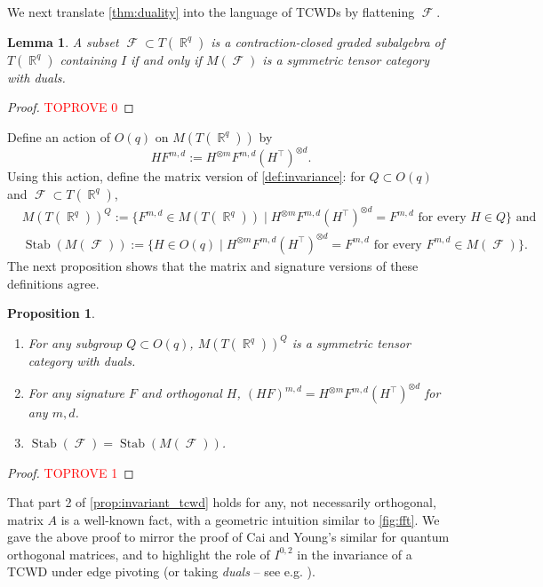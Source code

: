 \documentclass{article}
\newtheorem{proposition}{Proposition}[section]
\newtheorem{lemma}{Lemma}[section]
\theoremstyle{remark}
\theoremstyle{definition}
\DeclareMathOperator{\rr}{\mathbb{R}}
\DeclareMathOperator{\fc}{\mathcal{F}}
\DeclareMathOperator{\stab}{Stab}
\begin{document}
We next translate \autoref{thm:duality} into the language of TCWDs by flattening
$\fc$. 
\begin{lemma}
    \label{lem:tcwd}
    A subset $\fc \subset T(\rr^q)$ is a contraction-closed graded subalgebra of $T(\rr^q)$ containing
    $I$ if and only if $M(\fc)$ is a symmetric tensor category with duals.
\end{lemma}
\begin{proof}\textcolor{red}{TOPROVE 0}\end{proof}

Define an action of $O(q)$ on $M(T(\rr^q))$ by 
\[
    HF^{m,d} := H^{\otimes m} F^{m,d} (H^\top)^{\otimes d}.
\]
Using this action, define the matrix version of \autoref{def:invariance}: for $Q \subset O(q)$ and
$\fc \subset T(\rr^q)$,
\begin{align*}
    &M(T(\rr^q))^Q := \{F^{m,d} \in M(T(\rr^q)) \mid H^{\otimes m} F^{m,d} (H^\top)^{\otimes d} = F^{m,d} \text{ for every } H \in Q\} \text{ and}\\
    &\stab(M(\fc)) := \{H \in O(q) \mid H^{\otimes m}F^{m,d} (H^\top)^{\otimes d} = F^{m,d} \text{ for every } F^{m,d} \in M(\fc)\}. 
\end{align*}
The next proposition shows that the matrix and signature versions of these definitions agree.
\begin{proposition}
    \label{prop:invariant_tcwd}
    ~
    \begin{enumerate}
        \item For any subgroup $Q \subset O(q)$, $M(T(\rr^q))^Q$ is a symmetric tensor category with duals.
        \item For any signature $F$ and orthogonal $H$,
            $(HF)^{m,d} = H^{\otimes m} F^{m,d} (H^\top)^{\otimes d}$ for any $m,d$.
        \item $\stab(\fc) = \stab(M(\fc))$. 
    \end{enumerate}
\end{proposition}
\begin{proof}\textcolor{red}{TOPROVE 1}\end{proof}
That part 2 of \autoref{prop:invariant_tcwd} holds for any, not necessarily orthogonal, matrix $A$
is a well-known fact, with a geometric intuition similar to \autoref{fig:fft}. We gave the above
proof to mirror the proof of Cai and Young's similar \cite[Lemma 6]{cai_planar_2023} for quantum
orthogonal matrices, and to highlight the role of $I^{0,2}$ 
in the invariance of a TCWD under edge pivoting (or taking \emph{duals} --
see e.g. \cite[Appendix D]{cai_planar_2023}).
\end{document}
